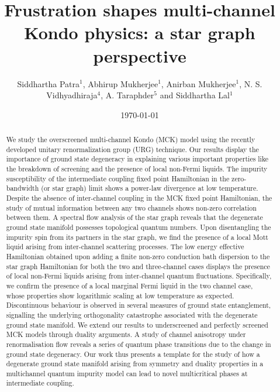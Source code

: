 \documentclass{iopart}
\begin{document}
\title{Frustration shapes multi-channel Kondo physics: a star graph perspective}
\author{Siddhartha Patra$^1$, Abhirup Mukherjee$^1$, Anirban Mukherjee$^1$, N. S. Vidhyadhiraja$^4$, A. Taraphder$^5$ and Siddhartha Lal$^1$}

\address{$^1$Department of Physical Sciences, Indian Institute of Science Education and Research-Kolkata, W.B. 741246, India}

\address{$^4$Theoretical Sciences Unit, Jawaharlal Nehru Center for Advanced Scientific Research, Jakkur, Bengaluru 560064, India}

\address{$^5$Department of Physics, Indian Institute of Technology Kharagpur, Kharagpur 721302, India}

\date{\today}

\begin{abstract}
	We study the overscreened multi-channel Kondo (MCK) model using the recently developed unitary renormalization group (URG) technique. Our results display the importance of ground state degeneracy in explaining various important properties like the breakdown of screening and the presence of local non-Fermi liquids. The impurity susceptibility of the intermediate coupling fixed point Hamiltonian in the zero-bandwidth (or star graph) limit shows a power-law divergence at low temperature. Despite the absence of inter-channel coupling in the MCK fixed point Hamiltonian, the study of mutual information between any two channels shows non-zero correlation between them. A spectral flow analysis of the star graph reveals that the degenerate ground state manifold possesses topological quantum numbers. Upon disentangling the impurity spin from its partners in the star graph, we find the presence of a local Mott liquid arising from inter-channel scattering processes. The low energy effective Hamiltonian obtained upon adding a finite non-zero conduction bath dispersion to the star graph Hamiltonian for both the two and three-channel cases displays the presence of local non-Fermi liquids arising from inter-channel quantum fluctuations. Specifically, we confirm the presence of a local marginal Fermi liquid in the two channel case, whose properties show logarithmic scaling at low temperature as expected.
Discontinuous behaviour is observed in several measures of ground state entanglement, signalling
the underlying orthogonality catastrophe associated with the degenerate ground state manifold. 
We extend our results to underscreened and perfectly screened MCK models through duality arguments.
A study of channel anisotropy under renormalisation flow reveals a series of quantum phase transitions due to the change in ground state degeneracy. Our work thus presents a template for the study of how a degenerate ground state manifold arising from symmetry and duality properties in a multichannel quantum impurity model can lead to novel multicritical phases at intermediate coupling.   

\end{abstract}
\end{document}
